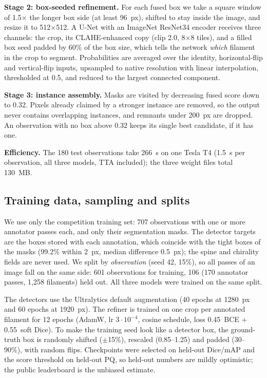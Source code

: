 \documentclass[sigconf]{acmart}
\begin{document}
\textbf{Stage 2: box-seeded refinement.} For each fused box we take a square window of 1.5$\times$ the longer box side (at least 96~px), shifted to stay inside the image, and resize it to 512$\times$512. A U-Net \cite{ronneberger2015unet} with an ImageNet ResNet34 encoder \cite{he2016resnet,iakubovskii2019smp} receives three channels: the crop, its CLAHE-enhanced copy \cite{zuiderveld1994clahe} (clip 2.0, 8$\times$8 tiles), and a filled box seed padded by 60\% of the box size, which tells the network \emph{which} filament in the crop to segment. Probabilities are averaged over the identity, horizontal-flip and vertical-flip inputs, upsampled to native resolution with linear interpolation, thresholded at 0.5, and reduced to the largest connected component.

\textbf{Stage 3: instance assembly.} Masks are visited by decreasing fused score down to 0.32. Pixels already claimed by a stronger instance are removed, so the output never contains overlapping instances, and remnants under 200~px are dropped. An observation with no box above 0.32 keeps its single best candidate, if it has one.

\textbf{Efficiency.} The 180 test observations take 266~s on one Tesla T4 (1.5~s per observation, all three models, TTA included); the three weight files total 130~MB.

\subsection{Training data, sampling and splits}
We use only the competition training set: 707 observations with one or more annotator passes each, and only their segmentation masks. The detector targets are the boxes stored with each annotation, which coincide with the tight boxes of the masks (99.2\% within 2~px, median difference 0.5~px); the spine and chirality fields are never used. We split by \emph{observation} (seed 42, 15\%), so all passes of an image fall on the same side: 601 observations for training, 106 (170 annotator passes, 1{,}258 filaments) held out. All three models were trained on the same split.

The detectors use the Ultralytics default augmentation (40 epochs at 1280~px and 60 epochs at 1920~px). The refiner is trained on one crop per annotated filament for 12 epochs (AdamW, lr $3\cdot10^{-4}$, cosine schedule, loss 0.45~BCE + 0.55~soft Dice). To make the training seed look like a detector box, the ground-truth box is randomly shifted ($\pm$15\%), rescaled (0.85--1.25) and padded (30--90\%), with random flips. Checkpoints were selected on held-out Dice/mAP and the score threshold on held-out PQ, so held-out numbers are mildly optimistic; the public leaderboard is the unbiased estimate.
\end{document}
